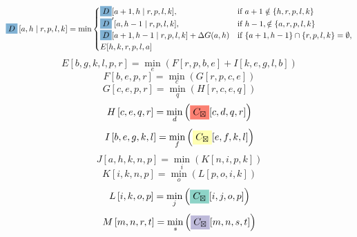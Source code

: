 \documentclass{article}
\begin{document}
$$ \colorbox{c4}{$D$} \left[a,h \mid  r,p,l,k \right] =  \min\begin{cases}\colorbox{c4}{$D$}[ a+1 , h\mid r,p,l,k ], &\text{if } a+1 \notin\{ h , r,p,l,k \} \\\colorbox{c4}{$D$}'[ a , h-1\mid r,p,l,k ], &\text{if } h-1 ,\notin\{ a , r,p,l,k \} \\\colorbox{c4}{$D$}[ a+1 , h-1\mid r,p,l,k ]+\Delta G(a,h) &\text{if } \{ a+1 , h-1 \}\cap \{ r,p,l,k \}=\emptyset,\\E[h,k,r,p,l,a]\end{cases}$$
$$ E\left[ b,g,k,l,p,r \right] =\min_{ e } \left( F[r,p,b,e]+I[k,e,g,l,b]\right) $$
$$ F\left[ b,e,p,r \right] =\min_{ c } \left( G[r,p,c,e]\right) $$
$$ G\left[ c,e,p,r \right] =\min_{ q } \left( H[r,c,e,q]\right) $$
$$ H\left[ c,e,q,r \right] =\min_{ d } \left( \colorbox{c3}{$C_{\boxtimes}$}[c,d,q,r]\right) $$
$$ I\left[ b,e,g,k,l \right] =\min_{ f } \left( \colorbox{c1}{$C_{\boxtimes}$}[e,f,k,l]\right) $$
$$ J\left[ a,h,k,n,p \right] =\min_{ i } \left( K[n,i,p,k]\right) $$
$$ K\left[ i,k,n,p \right] =\min_{ o } \left( L[p,o,i,k]\right) $$
$$ L\left[ i,k,o,p \right] =\min_{ j } \left( \colorbox{c0}{$C_{\boxtimes}$}[i,j,o,p]\right) $$
$$ M\left[ m,n,r,t \right] =\min_{ s } \left( \colorbox{c2}{$C_{\boxtimes}$}[m,n,s,t]\right) $$
\end{document}
